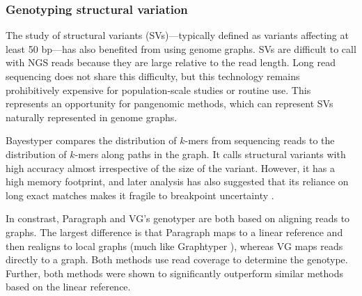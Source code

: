 \subsubsection{Genotyping structural variation}

The study of structural variants (SVs)---typically defined as variants affecting at least 50 bp---has also benefited from using genome graphs.
SVs are difficult to call with NGS reads because they are large relative to the read length.
Long read sequencing does not share this difficulty, but this technology remains prohibitively expensive for population-scale studies or routine use.
This represents an opportunity for pangenomic methods, which can represent SVs naturally represented in genome graphs.

Bayestyper \cite{sibbesen2018accurate} compares the distribution of $k$-mers from sequencing reads to the distribution of $k$-mers along paths in the graph.
It calls structural variants with high accuracy almost irrespective of the size of the variant.
However, it has a high memory footprint, and later analysis has also suggested that its reliance on long exact matches makes it fragile to breakpoint uncertainty \cite{hickey2019genotyping}.

In constrast, Paragraph \cite{chen2019paragraph} and VG's genotyper \cite{hickey2019genotyping} are both based on aligning reads to graphs.
The largest difference is that Paragraph maps to a linear reference and then realigns to local graphs (much like Graphtyper \cite{eggertsson2017graphtyper}), whereas VG maps reads directly to a graph.
Both methods use read coverage to determine the genotype.
Further, both methods were shown to significantly outperform similar methods based on the linear reference.

%

